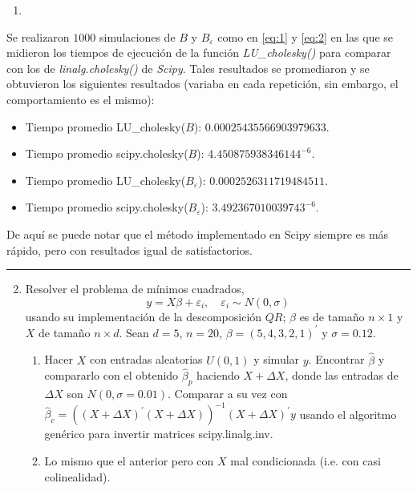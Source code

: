 {\color{blue}
	\begin{enumerate}[label=(\alph*), start=3]
		\item  
\end{enumerate}}
Se realizaron $1000$ simulaciones de $B$ y $B_\varepsilon$ como en \eqref{eq:1} y \eqref{eq:2} en las que se midieron los tiempos de ejecución de la función \textit{LU\_cholesky()} para comparar con los de \textit{linalg.cholesky()} de \textit{Scipy}. Tales resultados se promediaron y se obtuvieron los siguientes resultados (variaba en cada repetición, sin embargo, el comportamiento es el mismo):
\begin{itemize}
	\item Tiempo promedio LU\_cholesky($B$): $0.00025435566903979633$.
	\item Tiempo promedio scipy.cholesky($B$): $4.450875938346144^{-6}$.
	\item Tiempo promedio LU\_cholesky($B_{\varepsilon}$): $0.0002526311719484511$.
	\item Tiempo promedio scipy.cholesky($B_{\varepsilon}$): $3.492367010039743^{-6}$.
\end{itemize}
De aquí se puede notar que el método implementado en Scipy siempre es más rápido, pero con resultados igual de satisfactorios.

\vspace{5mm}
{\color{lightgray} \hrule}
\begin{enumerate} \setcounter{enumi}{1}
	\item Resolver el problema de mínimos cuadrados,
	\begin{equation} \label{eq:4}
		y=X \beta+\varepsilon_i, \quad \varepsilon_i \sim N(0, \sigma)
	\end{equation}
	usando su implementación de la descomposición $Q R $; $\beta$ es de tamaño $n \times 1$ y $X$ de tamaño $n \times d$. Sean $d=5$, $n=20$, $\beta=(5,4,3,2,1)^{\prime}$ y $\sigma=0.12$.
	\begin{enumerate}
		\item Hacer $X$ con entradas aleatorias $U(0,1)$ y simular $y$. Encontrar $\hat{\beta}$ y compararlo con el obtenido $\hat{\beta}_p$ haciendo $X+\Delta X$, donde las entradas de $\Delta X$ son $N(0, \sigma=0.01)$. Comparar a su vez con $\hat{\beta}_c=\left((X+\Delta X)^{\prime}(X+\Delta X)\right)^{-1}(X+\Delta X)^{\prime} y$ usando el algoritmo genérico para invertir matrices scipy.linalg.inv.
		\item Lo mismo que el anterior pero con $X$ mal condicionada (i.e. con casi colinealidad).
	\end{enumerate}
\end{enumerate}

